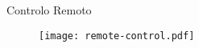 \begin{frame}{Controlo Remoto}
	\begin{figure}
		\centering
		\texttt{[image: remote-control.pdf]}
	\end{figure}
\end{frame}